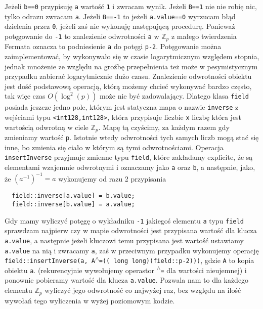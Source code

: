 \documentclass{article}
\begin{document}
Jeżeli \texttt{b==0} przypisuję \texttt{a} wartość \texttt{1} i zwracam wynik. Jeżeli \texttt{B==1}  nie 
nie robię nic, tylko odrazu zwracam \texttt{a}. Jeżeli \texttt{B==-1} to jeżeli \texttt{a.value==0} 
wyrzucam błąd dzielenia przez \texttt{0}, jeżeli zaś nie wykonuję następującą procedurę.
Ponieważ potęgowanie do \texttt{-1} to znalezienie odwrotności \texttt{a} w $\mathbb{Z}_p$
z małego twierdzenia Fermata oznacza to podniesienie \texttt{a} do potęgi 
\texttt{p-2}. Potęgowanie można zaimplementować, by wykonywało się w czasie logarytmicznym
względem stopnia, jednak mnożenie ze względu na groźbę przepełnienia
też może w pesymistycznym przypadku zabierać logarytmicznie dużo czasu.
Znalezienie odwrotności obiektu jest dość podstawową operacją, którą 
możemy chcieć wykonywać bardzo często, tak więc czas $O(\log ^2(p))$ może
nie być zadowalający. Dlatego klasa \texttt{field} posiada jeszcze jedno pole, którym
jest statyczna mapa o nazwie \texttt{inverse} z wejściami typu 
\texttt{<\texttt{\textunderscore \textunderscore int128},\texttt{\textunderscore \textunderscore int128}>}, która przypisuje 
liczbie \texttt{x} liczbę która jest wartością odwrotną w ciele $\mathbb{Z}_p$. Mapę tą
czyścimy, za każdym razem gdy zmieniamy wartość \texttt{p}. Istotnie wtedy odwrotności
tych samych liczb mogą stać się inne, bo zmienia się ciało w którym są tymi odwrotnościami.
Operacja \texttt{insertInverse} przyjmuje zmienne typu \texttt{field}, które zakładamy
explicite, że są elementami wzajemnie odwrotnymi i oznaczamy jako \texttt{a} oraz \texttt{b}, 
a następnie, jako, że $(a^{-1})^{-1}=a$ wykonujemy od razu 2 przypisania
\begin{lstlisting}
  field::inverse[a.value] = b.value;
  field::inverse[b.value] = a.value;
\end{lstlisting}
Gdy mamy wyliczyć potęgę o wykładniku \texttt{-1} jakiegoś elementu \texttt{a} typu \texttt{field} sprawdzam 
najpierw czy w mapie odwrotności jest przypisana wartość dla klucza \texttt{a.value}, 
a następnie jeżeli kluczowi temu przypisana jest wartość ustawiamy \texttt{a.value} na nią i zwracamy \texttt{a}, zaś
w przeciwnym przypadku wykonujemy operację 
\texttt{field::insertInverse(a, A\textsuperscript{$\wedge$}=(( long long)(field::p-2)))}, gdzie \texttt{A} to kopia
obiektu \texttt{a}.
(rekurencyjnie wywołujemy operastor \texttt{\textsuperscript{$\wedge$}=} dla wartości nieujemnej)
i ponownie pobieramy wartość dla klucza \texttt{a.value}. Pozwala nam to dla każdego elementu 
$\mathbb{Z}_p$ wyliczyć
jego odwrotność co najwyżej raz, bez względu na ilość wywołań tego wyliczenia w wyżej poziomowym 
kodzie. 
\end{document}
